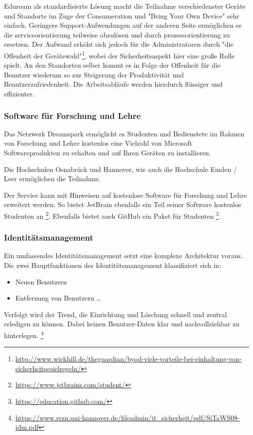\documentclass[a4paper, 12pt]{scrreprt}
\begin{document}
Eduroam als standardisierte Lösung macht die Teilnahme verschiedenster Geräte und Standorte im Zuge der Consumeration und "Bring Your Own Device" sehr einfach. Geringere Support-Aufwendungen auf der anderen Seite ermöglichen es die serviceorientierung teilweise abzulösen und durch prozessorientierung zu ersetzen. Der Aufwand erhöht sich jedoch für die Administratoren durch "die Offenheit der Gerätewahl"\footnote{\url{http://www.wickhill.de/theguardian/byod-viele-vorteile-bei-einhaltung-von-sicherheitsspielregeln/}}, wobei der Sicherheitsaspekt hier eine große Rolle spielt. An den Standorten selber kommt es in Folge der Offenheit für die Benutzer wiederum so zur Steigerung der Produktivität und Benutzerzufriedenheit. Die Arbeitsabläufe werden hierdurch flüssiger und effizienter.

\subsubsection{Software für Forschung und Lehre}
Das Netzwerk Dreamspark ermöglicht es Studenten und Bedienstete im Rahmen von Forschung und Lehre kostenlos eine Vielzahl von Microsoft Softwareprodukten zu erhalten und auf Ihren Geräten zu installieren.

Die Hochschulen Osnabrück und Hannover, wie auch die Hochschule Emden / Leer ermöglichen die Teilnahme.

Der Service kann mit Hinweisen auf kostenlose Software für Forschung und Lehre erweitert werden. So bietet JetBrain  ebenfalls ein Teil seiner Software kostenlos Studenten an \footnote{\url{https://www.jetbrains.com/student/}}. Ebenfalls bietet auch GitHub ein Paket für Studenten \footnote{\url{https://education.github.com/}}.


\subsubsection{Identitätsmanagement}
Ein umfassendes Identitätsmanagement setzt eine komplexe Architektur voraus. Die zwei Hauptfunktionen des Identitätsmanagement klassifiziert sich in:

\begin{itemize}
  \item Neuen Benutzern
  \item Entfernung von Benutzern \ldots
\end{itemize}


Verfolgt wird der Trend, die Einrichtung und Löschung schnell und zentral erledigen zu können. Dabei keinen Benutzer-Daten klar und nachvollziehbar zu hinterlegen. \footnote{\url{https://www.rrzn.uni-hannover.de/fileadmin/it_sicherheit/pdf/SiTaWS08-idm.pdf}}
\end{document}
